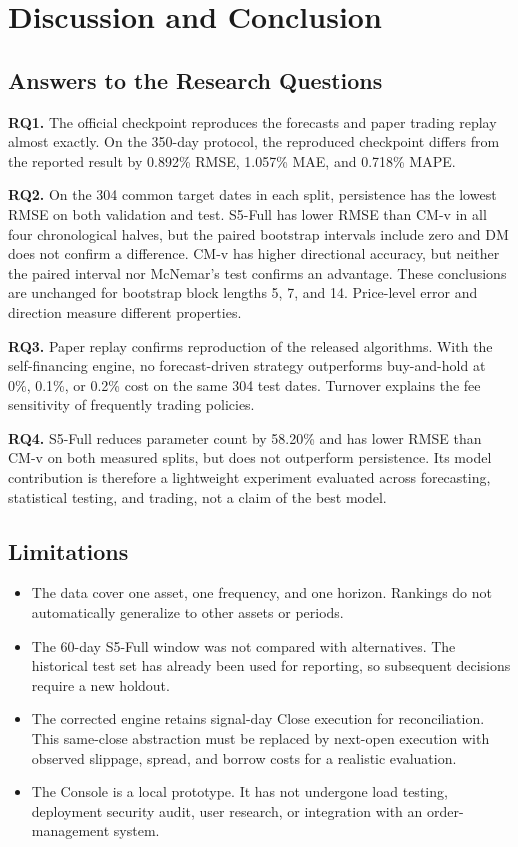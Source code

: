 \documentclass[13pt,a4paper,oneside]{report}
\begin{document}
\chapter{Discussion and Conclusion}\label{chap:discussion}

\section{Answers to the Research Questions}\label{sec:answers}
\textbf{RQ1.} The official checkpoint reproduces the forecasts and paper trading replay almost
exactly. On the 350-day protocol, the reproduced checkpoint differs from the reported result by
\num{0.892}\% RMSE, \num{1.057}\% MAE, and \num{0.718}\% MAPE.

\textbf{RQ2.} On the 304 common target dates in each split, persistence has the lowest RMSE on
both validation and test. S5-Full has lower RMSE than CM-v in all four chronological halves, but
the paired bootstrap intervals include zero and DM does not confirm a difference. CM-v has higher
directional accuracy, but neither the paired interval nor McNemar's test confirms an advantage.
These conclusions are unchanged for bootstrap block lengths \num{5}, \num{7}, and \num{14}.
Price-level error and direction measure different properties.

\textbf{RQ3.} Paper replay confirms reproduction of the released algorithms. With the
self-financing engine, no forecast-driven strategy outperforms buy-and-hold at 0\%, 0.1\%, or 0.2\%
cost on the same 304 test dates. Turnover explains the fee sensitivity of frequently trading
policies.

\textbf{RQ4.} S5-Full reduces parameter count by \num{58.20}\% and has lower RMSE than CM-v on both
measured splits, but does not outperform persistence. Its model contribution is therefore a
lightweight experiment evaluated across forecasting, statistical testing, and trading, not a claim
of the best model.

\section{Limitations}\label{sec:limitations}
\begin{itemize}
\item The data cover one asset, one frequency, and one horizon. Rankings do not automatically
generalize to other assets or periods.
\item The 60-day S5-Full window was not compared with alternatives. The historical test set has
already been used for reporting, so subsequent decisions require a new holdout.
\item The corrected engine retains signal-day Close execution for reconciliation. This same-close
abstraction must be replaced by next-open execution with observed slippage, spread, and borrow
costs for a realistic evaluation.
\item The Console is a local prototype. It has not undergone load testing, deployment security
audit, user research, or integration with an order-management system.
\end{itemize}
\end{document}
